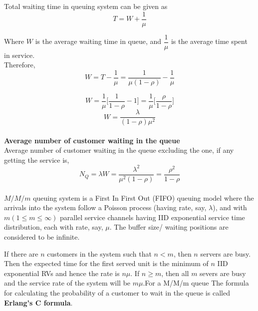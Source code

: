 Total waiting time in queuing system can be given as 
\begin{equation}
    T = W + \dfrac{1}{\mu}
\end{equation}

Where $W$ is the average waiting time in queue, and $\dfrac{1}{\mu}$ is the average time spent in service.\\

Therefore, 
\begin{equation}
    W = T - \dfrac{1}{\mu} = \dfrac{1}{\mu(1-\rho)}-\dfrac{1}{\mu}
\end{equation}

\begin{equation}
    W = \dfrac{1}{\mu}\Bigg[\dfrac{1}{1-\rho}-1 \Bigg] = \dfrac{1}{\mu}\Bigg[\dfrac{\rho}{1-\rho}\Bigg] 
\end{equation}
\begin{equation}
    W = \dfrac{\lambda}{(1-\rho)\mu^2}
\end{equation}\\

\textbf{Average number of customer waiting in the queue }\\
Average number of customer waiting in the queue excluding the one, if any getting the service is,
\begin{equation}
    N_Q = \lambda W = \dfrac{\lambda^2}{\mu^2(1-\rho)} = \dfrac{\rho^2}{1-\rho}
\end{equation}\\
$M/M/m$ queuing system is a First In First Out (FIFO) queuing model where the arrivals into the system follow a Poisson process (having rate, say, $\lambda$), and with $m (1\leq m \leq \infty)$ parallel service channels having IID exponential service time distribution, each with rate, say, $\mu$. The buffer size/ waiting positions are considered to be infinite. 

If there are $n$ customers in the system such that $n < m$, then $n$ servers are busy. Then the expected time for the first served unit is the minimum of $n$ IID exponential RVs and hence the rate is $n\mu$. If $n \geq m$, then all $m$ severs are busy and the service rate of the system will be $m\mu$.For a M/M/m queue The formula for  calculating the probability of a customer to wait in the queue is called \textbf{Erlang's C formula}.

